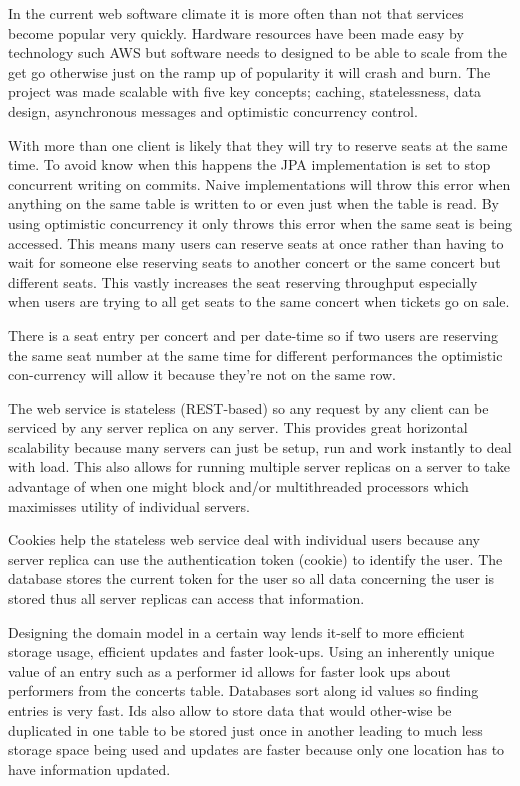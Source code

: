 \documentclass[10pt]{article}
\begin{document}
In the current web software climate it is more often than not that services become popular very quickly. Hardware resources have been made easy by technology such AWS but software needs to designed to be able to scale from the get go otherwise just on the ramp up of popularity it will crash and burn. The project was made scalable with five key concepts; caching, statelessness, data design, asynchronous messages and optimistic concurrency control.\\
\par
With more than one client is likely that they will try to reserve seats at the same time. To avoid know when this happens the JPA implementation is set to stop concurrent writing on commits. Naive implementations will throw this error when anything on the same table is written to or even just when the table is read. By using optimistic concurrency it only throws this error when the same seat is being accessed. This means many users can reserve seats at once rather than having to wait for someone else reserving seats to another concert or the same concert but different seats. This vastly increases the seat reserving throughput especially when users are trying to all get seats to the same concert when tickets go on sale.\\
\par
There is a seat entry per concert and per date-time so if two users are reserving the same seat number at the same time for different performances the optimistic con-currency will allow it because they're not on the same row. \\
\par
The web service is stateless (REST-based) so any request by any client can be serviced by any server replica on any server. This provides great horizontal scalability because many servers can just be setup, run and work instantly to deal with load. This also allows for running multiple server replicas on a server to take advantage of when one might block and/or multithreaded processors which maximisses utility of individual servers.\\
\par
Cookies help the stateless web service deal with individual users because any server replica can use the authentication token (cookie) to identify the user. The database stores the current token for the user so all data concerning the user is stored thus all server replicas can access that information.\\
\par
Designing the domain model in a certain way lends it-self to more efficient storage usage, efficient updates and faster look-ups. Using an inherently unique value of an entry such as a performer id allows for faster look ups about performers from the concerts table. Databases sort along id values so finding entries is very fast. Ids also allow to store data that would other-wise be duplicated in one table to be stored just once in another leading to much less storage space being used and updates are faster because only one location has to have information updated.\\
\end{document}
